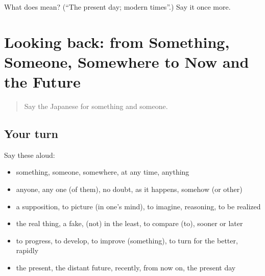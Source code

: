 \begin{tcolorbox}[breakable,colback=teal!4,colframe=teal!35!black,title={Before you move on}]
What does  mean? (\textquotedblleft{}The present day; modern times\textquotedblright{}.) Say it once more.
\end{tcolorbox}
\section[(dialogue)]{Looking back: from Something, Someone, Somewhere to Now and the Future}

\label{lesson:JA-R527-review-522-527}



\begin{quote}
Say the Japanese for something and someone.
\end{quote}

\subsection*{Your turn}
Say these aloud:

\begin{itemize}
\raggedright
  \item something, someone, somewhere, at any time, anything
  \item anyone, any one (of them), no doubt, as it happens, somehow (or other)
  \item a supposition, to picture (in one's mind), to imagine, reasoning, to be realized
  \item the real thing, a fake, (not) in the least, to compare (to), sooner or later
  \item to progress, to develop, to improve (something), to turn for the better, rapidly
  \item the present, the distant future, recently, from now on, the present day
\end{itemize}

